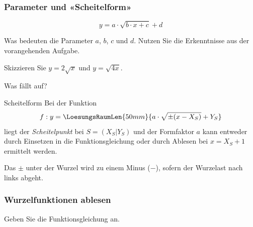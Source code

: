 \newpage


\subsubsection{Parameter und «Scheitelform»}
$$y = a\cdot{} \sqrt{b\cdot{}x + c} + d$$

Was bedeuten die Parameter $a$, $b$, $c$ und $d$. Nutzen Sie die
Erkenntnisse aus der vorangehenden Aufgabe.


Skizzieren Sie $y=2\sqrt{x}$ und $y=\sqrt{4x}$.

Was fällt auf?



\begin{gesetz}{Scheitelform}{}
  Bei der Funktion
  $$f: y = \LoesungsRaumLen{50mm}{a\cdot{}\sqrt{\pm(x-X_S)} + Y_S}$$
liegt der \textit{Scheitelpunkt} bei $S=(X_S | Y_S)$ und der Formfaktor $a$ kann
entweder durch Einsetzen in die Funktionsgleichung oder durch Ablesen
bei $x=X_S+1$ ermittelt werden.

Das $\pm$ unter der Wurzel wird zu einem Minus ($-$), sofern der
Wurzelast nach links abgeht.
\end{gesetz}

\newpage
\subsubsection{Wurzelfunktionen ablesen}

Geben Sie die Funktionsgleichung an.


